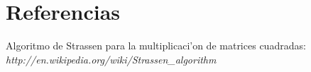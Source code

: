\documentclass[spanish, a4paper, 11pt]{article}
\begin{document}
\clearpage







\clearpage
\section{Referencias}
\begin{thebibliography}{99}

	 Algoritmo de Strassen para la multiplicaci'on de matrices cuadradas:\\  {\it http://en.wikipedia.org/wiki/Strassen\_algorithm}

\end{thebibliography}
\end{document}
